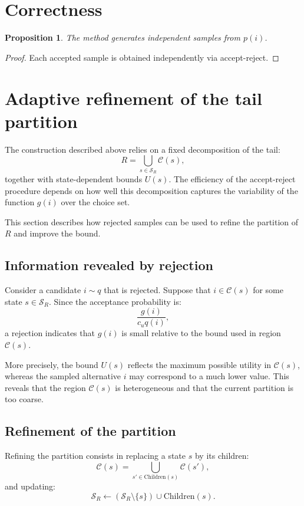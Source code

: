 \documentclass[11pt]{article}
\newtheorem{proposition}{Proposition}
\begin{document}
\section{Correctness}

\begin{proposition}
The method generates independent samples from $p(i)$.
\end{proposition}

\begin{proof}
Each accepted sample is obtained independently via accept-reject.
\end{proof}

\section{Adaptive refinement of the tail partition}

The construction described above relies on a fixed decomposition of the tail:
\[
R = \bigcup_{s \in \mathcal{S}_R} \mathcal{C}(s),
\]
together with state-dependent bounds $U(s)$. The efficiency of the accept-reject procedure depends on how well this decomposition captures the variability of the function $g(i)$ over the choice set.

This section describes how rejected samples can be used to refine the partition of $R$ and improve the bound.

\subsection{Information revealed by rejection}

Consider a candidate $i \sim q$ that is rejected. Suppose that $i \in \mathcal{C}(s)$ for some state $s \in \mathcal{S}_R$. Since the acceptance probability is:
\[
\frac{g(i)}{c_u q(i)},
\]
a rejection indicates that $g(i)$ is small relative to the bound used in region $\mathcal{C}(s)$.

More precisely, the bound $U(s)$ reflects the maximum possible utility in $\mathcal{C}(s)$, whereas the sampled alternative $i$ may correspond to a much lower value. This reveals that the region $\mathcal{C}(s)$ is heterogeneous and that the current partition is too coarse.

\subsection{Refinement of the partition}

Refining the partition consists in replacing a state $s$ by its children:
\[
\mathcal{C}(s) = \bigcup_{s' \in \text{Children}(s)} \mathcal{C}(s'),
\]
and updating:
\[
\mathcal{S}_R \leftarrow (\mathcal{S}_R \setminus \{s\}) \cup \text{Children}(s).
\]
\end{document}
